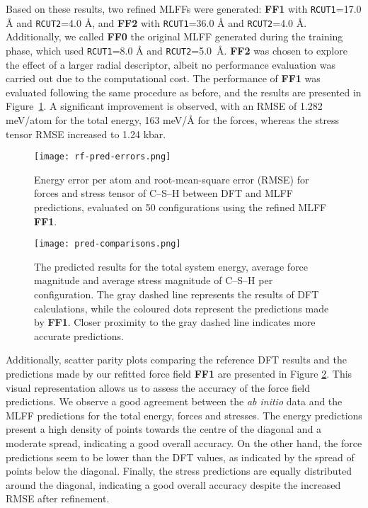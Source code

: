 Based on these results, two refined MLFFs were generated: \textbf{FF1} with \texttt{RCUT1}=17.0 \AA{} and \texttt{RCUT2}=4.0 \AA, and \textbf{FF2} with \texttt{RCUT1}=36.0 \AA{} and \texttt{RCUT2}=4.0 \AA{}. Additionally, we called \textbf{FF0} the original MLFF generated during the training phase, which used \texttt{RCUT1}=8.0 \AA{} and \texttt{RCUT2}=5.0~\AA. \textbf{FF2} was chosen to explore the effect of a larger radial descriptor, albeit no performance evaluation was carried out due to the computational cost. 
The performance of \textbf{FF1} was evaluated following the same procedure as before, and the results are presented in Figure~\ref{rf-pred-errors}. A significant improvement is observed, with an RMSE of 1.282 meV/atom for the total energy, 163 meV/\AA{} for the forces, whereas the stress tensor RMSE increased to 1.24 kbar.
\begin{figure}[h]
    \centering
    \texttt{[image: rf-pred-errors.png]}
    \caption{
    Energy error per atom and root-mean-square error (RMSE) for forces and stress tensor of C--S--H between DFT and MLFF predictions, evaluated on 50 configurations using the refined MLFF \textbf{FF1}.  
    }
    \label{rf-pred-errors}
\end{figure}
\begin{figure}[h]
    \centering
    \texttt{[image: pred-comparisons.png]}
    \caption{
    The predicted results for the total system energy, average force magnitude and average stress magnitude of C--S--H per configuration. The gray dashed line represents the results of DFT calculations, while the coloured dots represent the predictions made by \textbf{FF1}. Closer proximity to the gray dashed line indicates more accurate predictions.  
    }
    \label{rf-pred-comparisons}
\end{figure}

Additionally, scatter parity plots comparing the reference DFT results and the predictions made by our refitted force field \textbf{FF1} are presented in Figure \ref{rf-pred-comparisons}. This visual representation allows us to assess the accuracy of the force field predictions. We observe a good agreement between the \emph{ab initio} data and the MLFF predictions for the total energy, forces and stresses. The energy predictions present a high density of points towards the centre of the diagonal and a moderate spread, indicating a good overall accuracy. On the other hand, the force predictions seem to be lower than the DFT values, as indicated by the spread of points below the diagonal. Finally, the stress predictions are equally distributed around the diagonal, indicating a good overall accuracy despite the increased RMSE after refinement.

